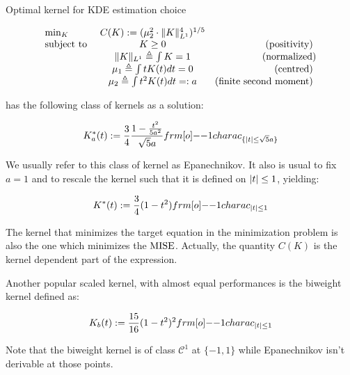 \documentclass[11pt]{book}
\begin{document}
\begin{theoreme}{Optimal kernel for KDE estimation choice}

\begin{equation}
\begin{array}{lcr}
\min_{ K  }  & C(K) := ( \mu_2 ^2 \cdot \lVert K\rVert_{L^1}^4 )^{1/5}      &     \\
\text{subject to }   & K \geq 0 & \text{(positivity) } \\
& \lVert K\rVert_{L^1} \triangleq  \int K = 1  & \text{(normalized)} \\
 & \mu_1 \triangleq  \int t K(t) dt = 0    & \text{(centred)                 } \\
& \mu_2 \triangleq  \int t^2 K(t) dt =: a         & \text{(finite second moment)   }           
\end{array}
\end{equation}

has the following class of kernels as a solution:

\begin{equation}
K^*_a(t) := \frac 3 4  \frac { 1 - \frac {t^2}{5 a^2} } {\sqrt{5} a } \11charac_{ \{ \abs t \leq \sqrt{5} a \} }
\end{equation} 

We usually refer to this class of kernel as Epanechnikov. It also is usual to fix $a=1$ and to rescale the kernel such that it is defined on $\lvert t\rvert \leq 1 $, yielding:


\begin{equation}
K^*(t) := \frac 3 4 ( 1 - t^2 )  \11charac_{ \abs t \leq 1 }
\end{equation} 
\end{theoreme} 

The kernel that minimizes the target equation in the minimization problem is also the one which minimizes the $\operatorname{MISE}$. Actually, the quantity $C(K)$ is the kernel dependent part of the expression. 

Another popular scaled kernel, with almost equal performances is the biweight kernel defined as:

\begin{equation}
K_b(t) := \frac {15}{16} ( 1 - t^2 )^2  \11charac_{ \abs t \leq 1 }
\end{equation} 

\begin{remarque}
Note that the biweight kernel is of class $\mathcal C^{1}$ at $\{-1, 1\}$ while Epanechnikov isn't derivable at those points.
\end{remarque}
\end{document}
